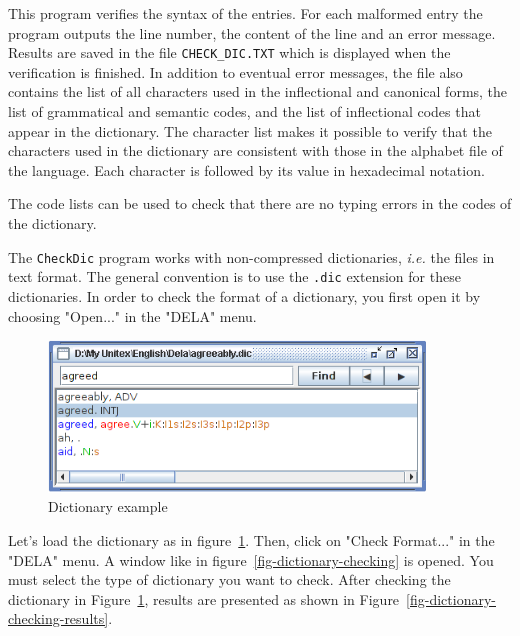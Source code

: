 \bigskip
\noindent This program verifies the syntax of the entries. For each malformed
entry the program outputs the line number, the content of the line and an error
message. Results are saved in the file
\verb+CHECK_DIC.TXT+ which is displayed when the
verification is finished. In addition to eventual error messages, the file also
contains the list of all characters used in the inflectional and canonical forms,
the list of grammatical and semantic codes, and the list of inflectional codes
that appear in the dictionary. The character list makes it possible to verify
that the characters used in the dictionary are consistent with those in the 
alphabet file of the language. Each character is followed by its value in hexadecimal
notation.

\bigskip
\noindent The code lists can be used to check that there are no typing errors 
in the codes of the dictionary.

\bigskip
\noindent The \verb+CheckDic+ program works with non-compressed dictionaries,
\textit{i.e.} the files in text format. The general convention is to use the
\verb+.dic+ extension for these dictionaries. In order to check the 
 format of a
dictionary, you first open it by choosing "Open..." in the "DELA" menu.

\begin{figure}[h]
\begin{center}
\includegraphics[width=10cm]{resources/img/fig3-4.png}
\caption{Dictionary example\label{fig-dictionary-example}}
\end{center}
\end{figure}

\noindent Let's load the dictionary as in figure~\ref{fig-dictionary-example}.
Then, click on "Check Format..." in the
"DELA" menu. A window like in
figure~\ref{fig-dictionary-checking} is opened. You
must select the type of dictionary you want to check. After checking the dictionary in Figure~\ref{fig-dictionary-example}, 
results are presented as shown in Figure~\ref{fig-dictionary-checking-results}.

